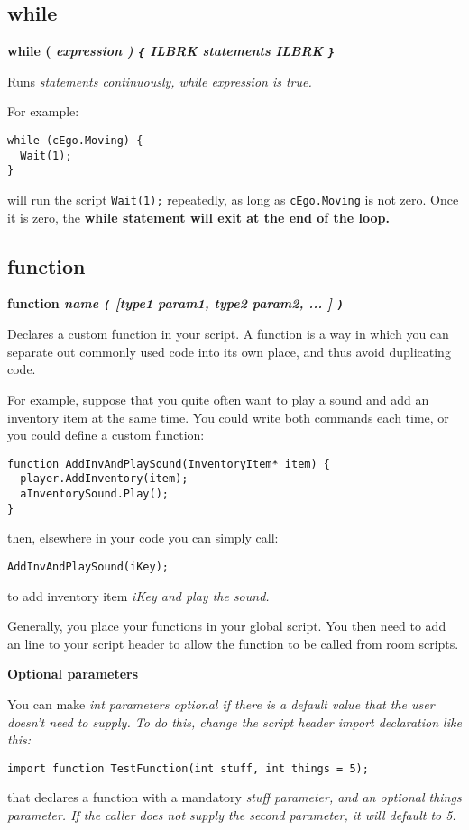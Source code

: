 \subsection{while}\label{whilestatement}%

\bf{while (} \it{expression} \bf{)}  \verb${$ ILBRK
  \it{statements} ILBRK
\verb$}$

Runs \it{statements} continuously, while \it{expression} is true.

For example:

\begin{verbatim}
while (cEgo.Moving) {
  Wait(1);
}
\end{verbatim}

will run the script \verb$Wait(1);$ repeatedly, as long as \verb$cEgo.Moving$ is
not zero. Once it is zero, the \bf{while} statement will exit at the end of the loop.


\subsection{function}\label{function}%

\bf{function} \it{name} \verb$($ [\it{type1 param1}, \it{type2 param2}, ... ] \verb$)$

Declares a custom function in your script. A function is a way in which you can
separate out commonly used code into its own place, and thus avoid duplicating code.

For example, suppose that you quite often want to play a sound and add an inventory item
at the same time. You could write both commands each time, or you could define a custom
function:

\begin{verbatim}
function AddInvAndPlaySound(InventoryItem* item) {
  player.AddInventory(item);
  aInventorySound.Play();
}
\end{verbatim}

then, elsewhere in your code you can simply call:
\begin{verbatim}
AddInvAndPlaySound(iKey);
\end{verbatim}
to add inventory item \it{iKey} and play the sound.

Generally, you place your functions in your global script. You then need to add
an  line to your script header to allow the function to be called
from room scripts.

\bf{Optional parameters}

You can make \it{int} parameters optional if there is a default value that the user
doesn't need to supply. To do this, change the script header \it{import} declaration like this:
\begin{verbatim}
import function TestFunction(int stuff, int things = 5);
\end{verbatim}
that declares a function with a mandatory \it{stuff} parameter, and an optional \it{things}
parameter. If the caller does not supply the second parameter, it will default to 5.

